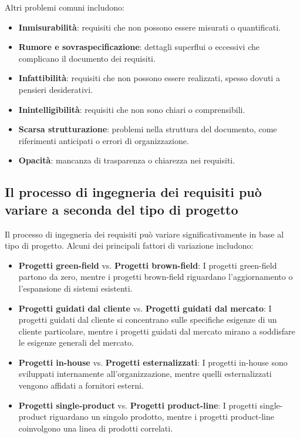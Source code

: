 Altri problemi comuni includono:

\begin{itemize}
    \item \textbf{Inmisurabilità}: requisiti che non possono essere misurati o quantificati.
    \item \textbf{Rumore e sovraspecificazione}: dettagli superflui o eccessivi che complicano il documento dei requisiti.
    \item \textbf{Infattibilità}: requisiti che non possono essere realizzati, spesso dovuti a pensieri desiderativi.
    \item \textbf{Inintelligibilità}: requisiti che non sono chiari o comprensibili.
    \item \textbf{Scarsa strutturazione}: problemi nella struttura del documento, come riferimenti anticipati o errori di organizzazione.
    \item \textbf{Opacità}: mancanza di trasparenza o chiarezza nei requisiti.
\end{itemize}

\subsection{Il processo di ingegneria dei requisiti può variare a seconda del
tipo di progetto}

Il processo di ingegneria dei requisiti può variare significativamente in base
al tipo di progetto. Alcuni dei principali fattori di variazione includono:

\begin{itemize}
    \item \textbf{Progetti green-field} vs. \textbf{Progetti brown-field}: I
    progetti green-field partono da zero, mentre i progetti brown-field riguardano
    l'aggiornamento o l'espansione di sistemi esistenti.
    \item \textbf{Progetti guidati dal cliente} vs. \textbf{Progetti guidati dal
    mercato}: I progetti guidati dal cliente si concentrano sulle specifiche
    esigenze di un cliente particolare, mentre i progetti guidati dal mercato
    mirano a soddisfare le esigenze generali del mercato.
    \item \textbf{Progetti in-house} vs. \textbf{Progetti esternalizzati}: I
    progetti in-house sono sviluppati internamente all'organizzazione, mentre
    quelli esternalizzati vengono affidati a fornitori esterni.
    \item \textbf{Progetti single-product} vs. \textbf{Progetti product-line}:
    I progetti single-product riguardano un singolo prodotto, mentre i progetti
    product-line coinvolgono una linea di prodotti correlati.
\end{itemize}

